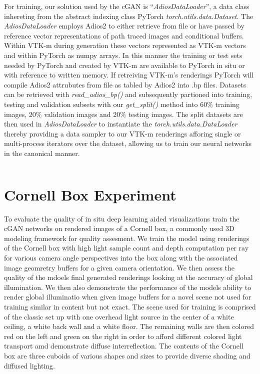 \documentclass[sigconf,authordraft]{acmart}
\begin{document}
For training, our solution used by the cGAN is ``{\it AdiosDataLoader}'', a data class inhereting from the abstract indexing class PyTorch {\it torch.utils.data.Dataset}. The {\it AdiosDataLoader} employs Adios2 to either retrieve from file or have passed by reference vector representations of path traced images and conditional buffers. Within VTK-m during generation these vectors represented as VTK-m vectors and within PyTorch as numpy arrays. In this manner the training or test sets needed by PyTorch and created by VTK-m are available to PyTorch in situ or with reference to written memory. If retreiving VTK-m's renderings PyTorch will compile Adios2 attrubutes from file as tabled by Adios2 into .bp files. Datasets can be retrieved with {\it read\_adios\_bp()} and subsequently partioned into training, testing and validation subsets with our {\it get\_split()} method into 60\% training images, 20\% validation images and 20\% testing images. The split datasets are then used in {\it AdiosDataLoader} to instantiate the {\it torch.utils.data.DataLoader} thereby providing a data sampler to our VTK-m renderings afforing single or multi-process iterators over the dataset, allowing us to train our neural networks in the canonical manner.
\inputminted{python}{pytorchDataLoader.py}

\section{Cornell Box Experiment}

To evaluate the quality of in situ deep learning aided visualizations train the cGAN networks on rendered images of a Cornell box, a commonly used 3D modeling framework for quality assesment. We train the model using renderings of the Cornell box with high light sample count and depth computation per ray for various camera angle perspectives into the box along with the associated image geomretry buffers for a given camera orientation. We then assess the quality of the mdoels final generated renderings looking at the accuracy of global illumination. We then also demonstrate the performance of the models ability to render global illuminatio when given image buffers for a novel scene not used for training similar in content but not exact. The scene used for training is comprised of the classic set up with one overhead light source in the center of a white ceiling, a white back wall and a white floor. The remaining walls are then colored red on the left and green on the right in order to afford different colored light transport amd demonstrate diffuse interreflection. The contents of the Cornell box are three cuboids of various shapes and sizes to provide diverse shading and diffused lighting. 
\end{document}
